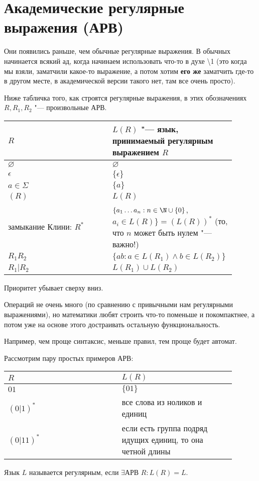 \section{Академические регулярные выражения (АРВ)}
Они появились раньше, чем обычные регулярные выражения. В обычных начинается всякий ад, когда начинаем использовать что-то в духе \textbackslash1
(это когда мы взяли, заматчили какое-то выражение, а потом хотим \textbf{его же} заматчить где-то в другом месте, в академической версии такого нет, там все очень просто).

Ниже табличка того, как строятся регулярные выражения, в этих обозначениях $R, R_1, R_2$ "--- произвольные АРВ.

\begin{tabular}{p{0.45\linewidth}|p{0.45\linewidth}}
$R$ & $L(R)$ "--- язык, принимаемый регулярным выражением $R$ \\
\hline
$\varnothing$ & $\varnothing$ \\
$\epsilon$ & $\{\epsilon\}$ \\
$a \in \Sigma$ & $\{a\}$ \\
$(R)$ & $L(R)$ \\
замыкание Клини: $R^*$ & $\{a_1 \dots a_n: n \in \N \cup \{0\}$, $a_i \in L(R)\} = (L(R))^*$ (то, что $n$ может быть нулем "--- важно!) \\
$R_1R_2$ & $\{ab: a \in L(R_1) \land b \in L(R_2)\}$ \\
$R_1 | R_2$ & $L(R_1) \cup L(R_2)$
\end{tabular}

Приоритет убывает сверху вниз.

\begin{Rem}
Операций не очень много (по сравнению с привычными нам регулярными выражениями), но математики любят строить что-то поменьше и покомпактнее, а потом уже на основе этого достраивать остальную функциональность.

Например, чем проще синтаксис, меньше правил, тем проще будет автомат.
\end{Rem}

\begin{exmp}
Рассмотрим пару простых примеров АРВ:

\begin{tabular}{p{0.45\linewidth} | p{0.45\linewidth}}
$R$ & $L(R)$ \\
\hline
$01$ & $\{01\}$ \\
$(0|1)^*$ & все слова из ноликов и единиц \\
$(0|11)^*$ & если есть группа подряд идущих единиц, то она четной длины
\end{tabular}
\end{exmp}

\begin{Def}
Язык $L$ называется регулярным, если $\exists \text{АРВ } R: L(R) = L$.
\end{Def}